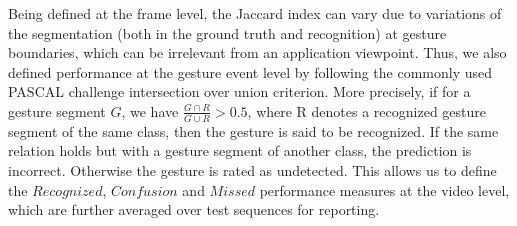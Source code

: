 Being defined at the frame level, the Jaccard index can vary due to variations of the segmentation (both in the ground truth and recognition)
at gesture boundaries, which can be irrelevant from an application viewpoint.
%
Thus, we also defined performance at the gesture event level by following the commonly used PASCAL challenge intersection over union criterion.
More precisely, if for a gesture segment $G$, we have $\frac{G \cap R}{G \cup R} >  0.5$, where R denotes a recognized gesture
segment of the same class, then the  gesture is said to be recognized.
%
If the same relation holds but with a gesture segment of another class, the prediction is incorrect.
Otherwise the gesture is rated as undetected. This allows us to define the $Recognized$, $Confusion$ and $Missed$ performance measures at the video level,
which are further averaged over test sequences for reporting.


